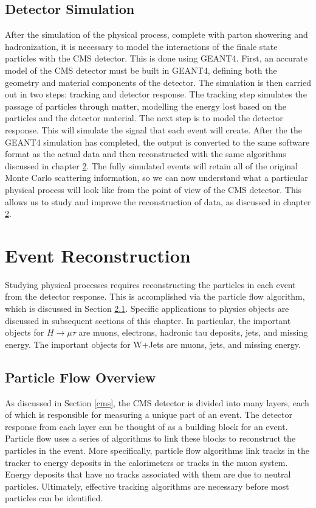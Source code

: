 \documentclass[oneside, letterpaper, oldfontcommands]{memoir}
\begin{document}
\section{Detector Simulation}\label{detectorsim}
\qquad After the simulation of the physical process, complete with parton showering and hadronization, it is necessary to model the interactions of the finale state particles with the CMS detector. This is done using GEANT4\cite{Allison:2006ve}. First, an accurate model of the CMS detector must be built in GEANT4, defining both the geometry and material components of the detector. The simulation is then carried out in two steps: tracking and detector response. The tracking step simulates the passage of particles through matter, modelling the energy lost based on the particles and the detector material. The next step is to model the detector response. This will simulate the signal that each event will create. After the the GEANT4 simulation has completed, the output is converted to the same software format as the actual data and then reconstructed with the same algorithms discussed in chapter \ref{eventreco}. The fully simulated events will retain all of the original Monte Carlo scattering information, so we can now understand what a particular physical process will look like from the point of view of the CMS detector. This allows us to study and improve the reconstruction of data, as discussed in chapter \ref{eventreco}.

\chapter{Event Reconstruction}\label{eventreco}

\qquad Studying physical processes requires reconstructing the particles in each event from the detector response. This is accomplished via the particle flow algorithm, which is discussed in Section \ref{pflow}. Specific applications to physics objects are discussed in subsequent sections of this chapter. In particular, the important objects for $H \rightarrow \mu\tau$ are muons, electrons, hadronic tau deposits, jets, and missing energy. The important objects for W+Jets are muons, jets, and missing energy.
\section{Particle Flow Overview}\label{pflow}
\qquad As discussed in Section \ref{cms}, the CMS detector is divided into many layers, each of which is responsible for measuring a unique part of an event. The detector response from each layer can be thought of as a building block for an event. Particle flow uses a series of algorithms to link these blocks to reconstruct the particles in the event. More specifically, particle flow algorithms link tracks in the tracker to energy deposits in the calorimeters or tracks in the muon system. Energy deposits that have no tracks associated with them are due to neutral particles. Ultimately, effective tracking algorithms are necessary before most particles can be identified.
\end{document}

